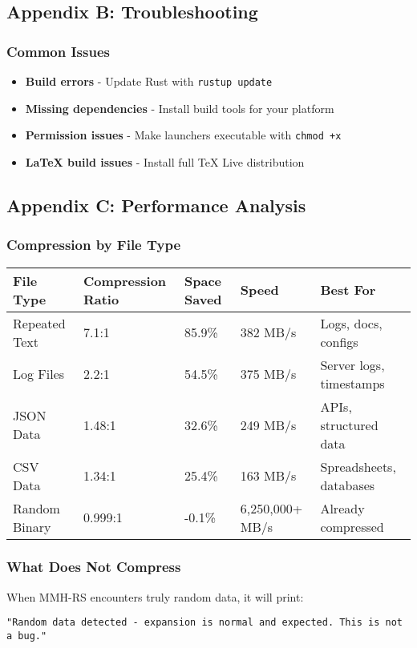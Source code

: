 \documentclass[11pt,a4paper]{article}
\begin{document}
	\subsection{Appendix B: Troubleshooting}

	\subsubsection{Common Issues}
	\begin{itemize}
		\item \textbf{Build errors} - Update Rust with \texttt{rustup update}
		\item \textbf{Missing dependencies} - Install build tools for your platform
		\item \textbf{Permission issues} - Make launchers executable with \texttt{chmod +x}
		\item \textbf{LaTeX build issues} - Install full TeX Live distribution
	\end{itemize}

	\subsection{Appendix C: Performance Analysis}

	\subsubsection{Compression by File Type}
	\begin{center}
	\begin{tabular}{@{}lllll@{}}
	\toprule
	\textbf{File Type} & \textbf{Compression Ratio} & \textbf{Space Saved} & \textbf{Speed} & \textbf{Best For} \\
	\midrule
	Repeated Text & 7.1:1 & 85.9\% & 382 MB/s & Logs, docs, configs \\
	Log Files & 2.2:1 & 54.5\% & 375 MB/s & Server logs, timestamps \\
	JSON Data & 1.48:1 & 32.6\% & 249 MB/s & APIs, structured data \\
	CSV Data & 1.34:1 & 25.4\% & 163 MB/s & Spreadsheets, databases \\
	Random Binary & 0.999:1 & -0.1\% & 6,250,000+ MB/s & Already compressed \\
	\bottomrule
	\end{tabular}
	\end{center}

	\subsubsection{What Does Not Compress}
	When MMH-RS encounters truly random data, it will print:
	\begin{lstlisting}[basicstyle=\ttfamily\small]
	"Random data detected - expansion is normal and expected. This is not a bug."
	\end{lstlisting}
\end{document}
